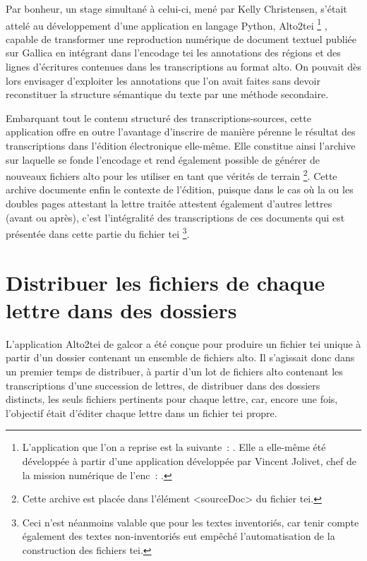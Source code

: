 \documentclass[a4paper,12pt,twoside]{book}
\begin{document}
			Par bonheur, un stage simultané à celui-ci, mené par Kelly Christensen, s'était attelé au développement d'une application en langage Python, Alto2tei
			\footnote{%
				L'application que l'on a reprise est la suivante~: \cite{christensenAltoTei2022}. Elle a elle-même été développée à partir d'une application développée par Vincent Jolivet, chef de la mission numérique de l'\gls{enc}~: \cite{jolivetAlto2tei2022}.
			}
			, capable de transformer une reproduction numérique de document textuel publiée sur Gallica en intégrant dans l'encodage \gls{tei} les annotations des régions et des lignes d'écritures contenues dans les transcriptions au format \gls{alto}. On pouvait dès lors envisager d'exploiter les annotations que l'on avait faites sans devoir reconstituer la structure sémantique du texte par une méthode secondaire.
			
			Embarquant tout le contenu structuré des transcriptions-sources, cette application offre en outre l'avantage d'inscrire de manière pérenne le résultat des transcriptions dans l'édition électronique elle-même. Elle constitue ainsi l'archive sur laquelle se fonde l'encodage et rend également possible de générer de nouveaux fichiers \gls{alto} pour les utiliser en tant que vérités de terrain
			\footnote{Cette archive est placée dans l'élément \textsf{<sourceDoc>} du fichier \gls{tei}.}. %
			Cette archive documente enfin le contexte de l'édition, puisque dans le cas où la ou les doubles pages attestant la lettre traitée attestent également d'autres lettres (avant ou après), c'est l'intégralité des transcriptions de ces documents qui est présentée dans cette partie du fichier \gls{tei}%
			\footnote{Ceci n'est néanmoins valable que pour les textes inventoriés, car tenir compte également des textes non-inventoriés eut empêché l'automatisation de la construction des fichiers \gls{tei}.}.
			
		\section{Distribuer les fichiers de chaque lettre dans des dossiers}
		
			L'application Alto2tei de \gls{galcor} a été conçue pour produire un fichier \gls{tei} unique à partir d'un dossier contenant un ensemble de fichiers \gls{alto}. Il s'agissait donc dans un premier temps de distribuer, à partir d'un lot de fichiers \gls{alto} contenant les transcriptions d'une succession de lettres, de distribuer dans des dossiers distincts, les seuls fichiers pertinents pour chaque lettre, car, encore une fois, l'objectif était d'éditer chaque lettre dans un fichier \gls{tei} propre.
			
\end{document}
